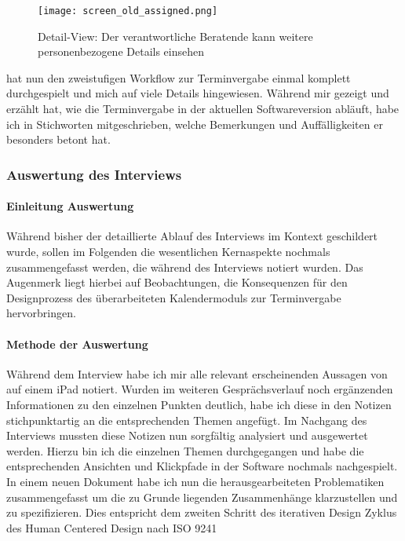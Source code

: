 \begin{figure}[H]
    \caption{Detail-View: Der verantwortliche Beratende kann weitere personenbezogene Details einsehen}
    \centering
    \texttt{[image: screen\_old\_assigned.png]}
\end{figure}

\ipName hat nun den zweistufigen Workflow zur Terminvergabe einmal komplett
durchgespielt und mich auf viele Details hingewiesen. Während \ipName mir
gezeigt und erzählt hat, wie die Terminvergabe in der aktuellen Softwareversion
abläuft, habe ich in Stichworten mitgeschrieben, welche Bemerkungen und
Auffälligkeiten er besonders betont hat.

\subsubsection{Auswertung des Interviews}

\paragraph{Einleitung Auswertung}
Während bisher der detaillierte Ablauf des Interviews im Kontext geschildert
wurde, sollen im Folgenden die wesentlichen Kernaspekte nochmals
zusammengefasst werden, die während des Interviews notiert wurden. Das
Augenmerk liegt hierbei auf Beobachtungen, die Konsequenzen für den
Designprozess des überarbeiteten Kalendermoduls zur Terminvergabe
hervorbringen.

\paragraph{Methode der Auswertung}
Während dem Interview habe ich mir alle relevant erscheinenden Aussagen von
\ipName auf einem iPad notiert. Wurden im weiteren Gesprächsverlauf noch
ergänzenden Informationen zu den einzelnen Punkten deutlich, habe ich diese in
den Notizen stichpunktartig an die entsprechenden Themen angefügt. Im Nachgang
des Interviews mussten diese Notizen nun sorgfältig analysiert und ausgewertet
werden. Hierzu bin ich die einzelnen Themen durchgegangen und habe die
entsprechenden Ansichten und Klickpfade in der Software nochmals nachgespielt.
In einem neuen Dokument habe ich nun die herausgearbeiteten Problematiken
zusammengefasst um die zu Grunde liegenden Zusammenhänge klarzustellen und zu
spezifizieren. Dies entspricht dem zweiten Schritt des iterativen Design Zyklus
des Human Centered Design nach ISO 9241 \cite{iso9241}

